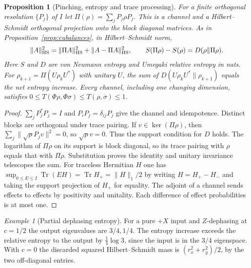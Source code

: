 \documentclass[aps,pra,onecolumn,superscriptaddress,nofootinbib,10pt]{revtex4-2}
\newtheorem{proposition}[theorem]{Proposition}
\theoremstyle{definition}
\theoremstyle{remark}
\newtheorem{example}[theorem]{Example}
\newcommand{\tr}{\operatorname{Tr}}
\begin{document}
\begin{proposition}[Pinching, entropy and trace processing]\label{ob:pinching}
For a finite orthogonal resolution $\{P_j\}$ of $I$ let
$\Pi(\rho)=\sum_jP_j\rho P_j$. This is a channel and a
Hilbert--Schmidt orthogonal projection onto the block diagonal matrices.
As in Proposition~\ref{prop:cubalances}, in Hilbert--Schmidt norm,
\[
 \|A\|_{\rm HS}^2=\|\Pi A\|_{\rm HS}^2+\|A-\Pi A\|_{\rm HS}^2,\qquad
 S(\Pi\rho)-S(\rho)=D(\rho\|\Pi\rho).
\]
Here $S$ and $D$ are von Neumann entropy and Umegaki relative entropy
in nats. For $\rho_{k+1}=\Pi(U\rho_kU^*)$ with unitary $U$, the sum
of $D(U\rho_kU^*\|\rho_{k+1})$ equals the net entropy increase.
Every channel, including one changing dimension, satisfies
$0\le T(\Phi\rho,\Phi\sigma)\le T(\rho,\sigma)\le1$.
\end{proposition}
\begin{proof}
$\sum_jP_j^*P_j=I$ and $P_iP_j=\delta_{ij}P_j$ give the channel
and idempotence. Distinct blocks are orthogonal under trace pairing.
If $v\in\ker(\Pi\rho)$, then $\sum_j\|\sqrt\rho P_jv\|^2=0$,
so $\sqrt\rho v=0$. Thus the support condition for $D$ holds.
The logarithm of $\Pi\rho$ on its support is block diagonal, so
its trace pairing with $\rho$ equals that with $\Pi\rho$.
Substitution proves the identity and unitary invariance telescopes
the sum. For traceless Hermitian $H$ one has
$\sup_{0\le E\le I}\tr(EH)=\tr H_+=\|H\|_1/2$ by writing
$H=H_+-H_-$ and taking the support projection of $H_+$ for equality.
The adjoint of a channel sends effects to effects by positivity
and unitality. Each difference of effect probabilities is at most one.
\end{proof}

\begin{example}[Partial dephasing entropy]\label{ob:partialentropy}
For a pure $+X$ input and $Z$-dephasing at $c=1/2$ the output
eigenvalues are $3/4,1/4$. The entropy increase exceeds the relative
entropy to the output by $\tfrac14\log3$, since the input is in
the $3/4$ eigenspace. With $c=0$ the discarded squared
Hilbert--Schmidt mass is $(r_x^2+r_y^2)/2$, by the two off-diagonal entries.
\end{example}
\end{document}
